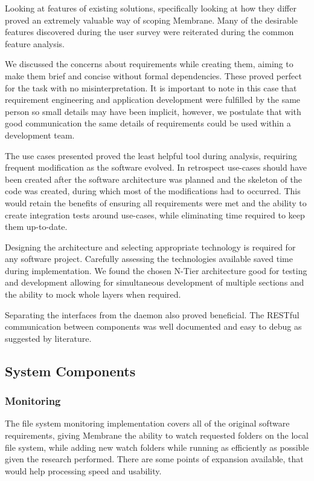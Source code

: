 \documentclass[11pt, a4paper, twoside]{report}
\begin{document}
Looking at features of existing solutions, specifically looking at how they differ proved an extremely valuable way of scoping Membrane. Many of the desirable features discovered during the user survey were reiterated during the common feature analysis.

We discussed the concerns about requirements while creating them, aiming to make them brief and concise without formal dependencies. These proved perfect for the task with no misinterpretation. It is important to note in this case that requirement engineering and application development were fulfilled by the same person so small details may have been implicit, however, we postulate that with good communication the same details of requirements could be used within a development team.

The use cases presented proved the least helpful tool during analysis, requiring frequent modification as the software evolved. In retrospect use-cases should have been created after the software architecture was planned and the skeleton of the code was created, during which most of the modifications had to occurred. This would retain the benefits of ensuring all requirements were met and the ability to create integration tests around use-cases, while eliminating time required to keep them up-to-date.

Designing the architecture and selecting appropriate technology is required for any software project. Carefully assessing the technologies available saved time during implementation. We found the chosen N-Tier architecture good for testing and development allowing for simultaneous development of multiple sections and the ability to mock whole layers when required.

Separating the interfaces from the daemon also proved beneficial. The RESTful communication between components was well documented and easy to debug as suggested by literature.

\subsection{System Components}

\subsubsection{Monitoring}

The file system monitoring implementation covers all of the original software requirements, giving Membrane the ability to watch requested folders on the local file system, while adding new watch folders while running as efficiently as possible given the research performed. There are some points of expansion available, that would help processing speed and usability.
\end{document}
